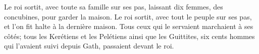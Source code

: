 Le roi sortit, avec toute sa famille sur ses pas,
	laissant dix femmes, des concubines, pour garder la maison.
Le roi sortit, avec tout le peuple sur ses pas, et l’on fit halte à la dernière maison.
Tous ceux qui le servaient marchaient à ses côtés;
	tous les Kerétiens et les Pelétiens ainsi que les Guittites,
	six cents hommes qui l’avaient suivi depuis Gath, passaient devant le roi.
